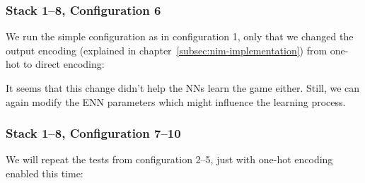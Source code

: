 \documentclass[11pt]{report}
\begin{document}
\begin{enumerate}
                \subsubsection{Stack 1--8, Configuration 6}
    We run the simple configuration as in configuration 1, only that we changed the output encoding (explained in chapter~\ref{subsec:nim-implementation}) from one-hot to direct encoding:
    \\
    \renewcommand{\csvpath}{../data/simple_nim/stack_8r/t_6/stats.csv} %
    \begin{center}
    \end{center}
    It seems that this change didn't help the NNs learn the game either.
    Still, we can again modify the ENN parameters which might influence the learning process.
                \subsubsection{Stack 1--8, Configuration 7--10}
    We will repeat the tests from configuration 2--5, just with one-hot encoding enabled this time:
    \begin{figure}[H]


\end{figure}
\end{enumerate}
\end{document}
